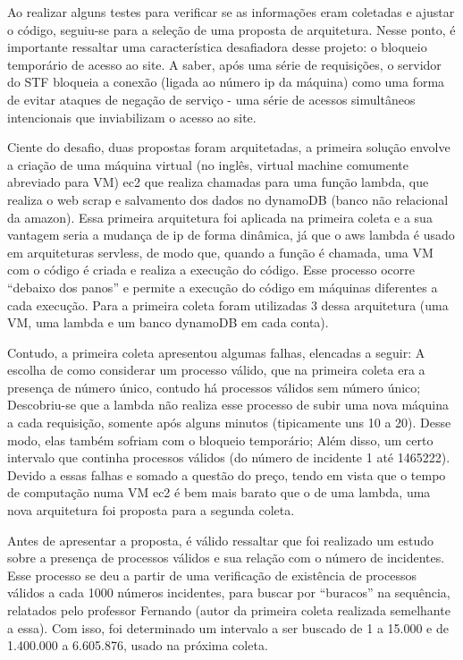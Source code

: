 Ao realizar alguns testes para verificar se as informações eram coletadas e ajustar o código, seguiu-se para a seleção de uma proposta de arquitetura. Nesse ponto, é importante ressaltar uma característica desafiadora desse projeto: o bloqueio temporário de acesso ao site. A saber, após uma série de requisições, o servidor do STF bloqueia a conexão (ligada ao número ip da máquina) como uma forma de evitar ataques de negação de serviço - uma série de acessos simultâneos intencionais que inviabilizam o acesso ao site.

Ciente do desafio, duas propostas foram arquitetadas, a primeira solução envolve a criação de uma máquina virtual (no inglês, virtual machine comumente abreviado para VM) ec2 que realiza chamadas para uma função lambda, que realiza o web scrap e salvamento dos dados no dynamoDB (banco não relacional da amazon). Essa primeira arquitetura foi aplicada na primeira coleta e a sua vantagem seria a mudança de ip de forma dinâmica, já que o aws lambda é usado em arquiteturas servless, de modo que, quando a função é chamada, uma VM com o código é criada e realiza a execução do código. Esse processo ocorre “debaixo dos panos” e permite a execução do código em máquinas diferentes a cada execução. Para a primeira coleta foram utilizadas 3 dessa arquitetura (uma VM, uma lambda e um banco dynamoDB em cada conta).

Contudo, a primeira coleta apresentou algumas falhas, elencadas a seguir: A escolha de como considerar um processo válido, que na primeira coleta era a presença de número único, contudo há processos válidos sem número único; Descobriu-se que a lambda não realiza esse processo de subir uma nova máquina a cada requisição, somente após alguns minutos (tipicamente uns 10 a 20). Desse modo, elas também sofriam com o bloqueio temporário; Além disso, um certo intervalo que continha processos válidos (do número de incidente 1 até 1465222). Devido a essas falhas e somado a questão do preço, tendo em vista que o tempo de computação numa VM ec2 é bem mais barato que o de uma lambda, uma nova arquitetura foi proposta para a segunda coleta. 

Antes de apresentar a proposta, é válido ressaltar que foi realizado um estudo sobre a presença de processos válidos e sua relação com o número de incidentes. Esse processo se deu a partir de uma verificação de existência de processos válidos a cada 1000 números incidentes, para buscar por “buracos” na sequência, relatados pelo professor Fernando (autor da primeira coleta realizada semelhante a essa). Com isso, foi determinado um intervalo a ser buscado de 1 a 15.000 e de 1.400.000 a 6.605.876, usado na próxima coleta.

